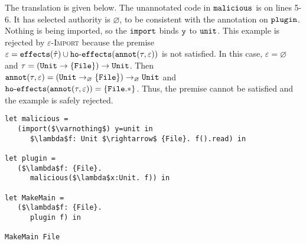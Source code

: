 The translation is given below. The unannotated code in $\mathtt{malicious}$ is on lines
5-6. It has selected authority is $\varnothing$, to be consistent with the annotation on
$\mathtt{plugin}$. Nothing is being imported, so the $\mathtt{import}$ binds $\mathtt{y}$ to
 $\mathtt{unit}$. This example is rejected by \textsc{$\varepsilon$-Import} because the
  premise $\varepsilon = \mathtt{effects}(\hat \tau) \cup \mathtt{ho \hbox{-} effects}(\mathtt{annot}(\tau, \varepsilon))$ is not satisfied. In this case, $\varepsilon = \varnothing$ and $\tau = \mathtt{ (Unit \rightarrow
\{ File \}) \rightarrow Unit }$. Then $\mathtt{annot}(\tau, \varepsilon) = \mathtt{ (Unit
\rightarrow_{\varnothing} \{ File \}) \rightarrow_{\varnothing} Unit }$ and
$\mathtt{ho \hbox{-} effects}(\mathtt{annot}(\tau, \varepsilon)) = \{ \mathtt{File.*} \}$. Thus, the premise cannot
be satisfied and the example is safely rejected.

\begin{lstlisting}
let malicious =
   (import($\varnothing$) y=unit in
      $\lambda$f: Unit $\rightarrow$ {File}. f().read) in

let plugin =
   ($\lambda$f: {File}.
      malicious($\lambda$x:Unit. f)) in

let MakeMain =
   ($\lambda$f: {File}.
      plugin f) in

MakeMain File
\end{lstlisting}

